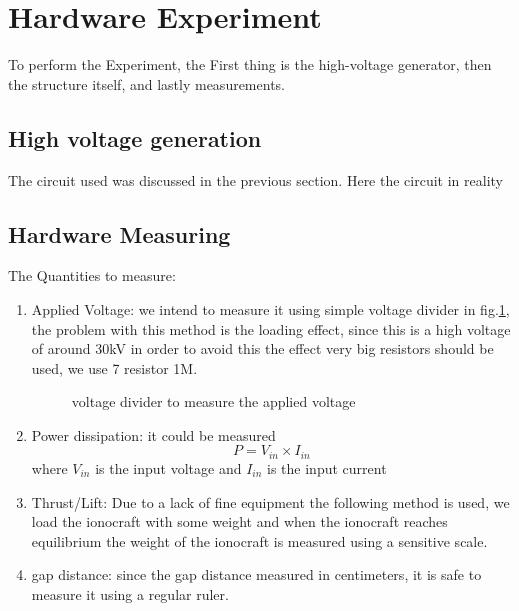 \section*{Hardware Experiment}
To perform the Experiment, the First thing is the high-voltage 
generator, then the structure itself, and lastly measurements.
\subsection*{High voltage generation}
The circuit used was discussed in the previous section. Here the 
circuit in reality %
\subsection*{Hardware Measuring}
The Quantities to measure:
\begin{enumerate}
	\item Applied Voltage: we intend to measure it using simple
		voltage divider in fig.\ref{voltage_divider},
		the problem with this method is the loading effect, since 
		this is a high voltage of around 30kV in order to avoid this
		the effect very big resistors should be used, we use 7 resistor
		1M.
		\begin{figure}[ht]
			\centering
			\label{voltage_divider}
			
			\caption{voltage divider to measure the applied
			voltage}
		\end{figure}
		
	\item Power dissipation: it could be measured 
		\begin{equation}
			P = V_{in} \times I_{in}
		\end{equation}
		where $V_{in}$ is the input voltage and $I_{in}$ is the 
		input  current

	\item Thrust/Lift: Due to a lack of fine equipment the following
		method is used, we load the ionocraft with some weight and 
		when the ionocraft reaches equilibrium the weight of the 
		ionocraft is measured using a sensitive scale.

	\item gap distance: since the gap distance measured in
		centimeters, it is safe to measure it using a regular ruler.
		
\end{enumerate}
